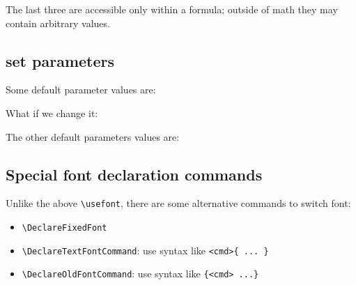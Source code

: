 \documentclass{article}
\begin{document}
The last three are accessible only within a formula; outside of math they may contain arbitrary values.

\subsection{set parameters}
Some default parameter values are:

What if we change it:

The other default parameters values are:
\begin{code}
\encodingdefault\par
\familydefault\par
\seriesdefault\par
\shapedefault\par
\bfdefault\par
\mddefault\par
\itdefault\par
\sldefault\par
\scdefault\par
\sscdefault\par
\swdefault\par
\ulcdefault\par
\updefault
\end{code}

\subsection{Special font declaration commands}
Unlike the above \verb|\usefont|, there are some alternative commands to switch font:
\begin{itemize}
  \item \verb|\DeclareFixedFont|
  \item \verb|\DeclareTextFontCommand|: use syntax like \verb|<cmd>{ ... }|
  \item \verb|\DeclareOldFontCommand|: use syntax like \verb|{<cmd> ...}|
\end{itemize}
\end{document}
